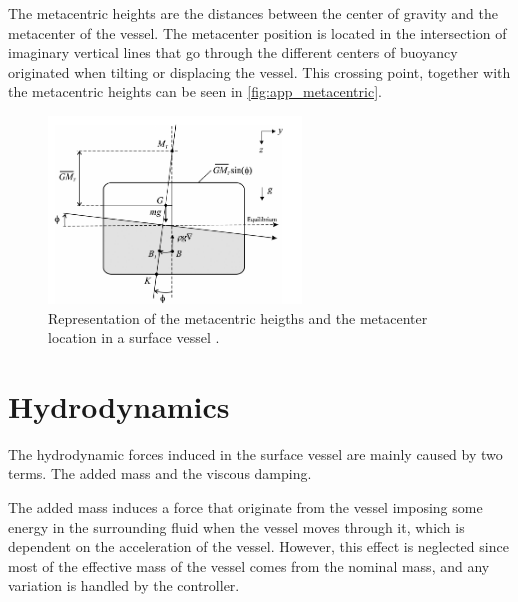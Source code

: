 The metacentric heights are the distances between the center of gravity and the metacenter of the vessel. The metacenter position is located in the intersection of imaginary vertical lines that go through the different centers of buoyancy originated when tilting or displacing the vessel. This crossing point, together with the metacentric heights can be seen in \autoref{fig:app_metacentric}.
\begin{figure}[H]
    \includegraphics[width=0.6\textwidth]{figures/metacenter}
    \caption{Representation of the metacentric heigths and the metacenter location in a surface vessel \cite[p. 62]{TFossen}.}
    \label{fig:app_metacentric}
\end{figure}

\section{Hydrodynamics}
The hydrodynamic forces induced in the surface vessel are mainly caused by two terms. The added mass and the viscous damping.

The added mass induces a force that originate from the vessel imposing some energy in the surrounding fluid when the vessel moves through it, which is dependent on the acceleration of the vessel. However, this effect is neglected since most of the effective mass of the vessel comes from the nominal mass, and any variation is handled by the controller.

